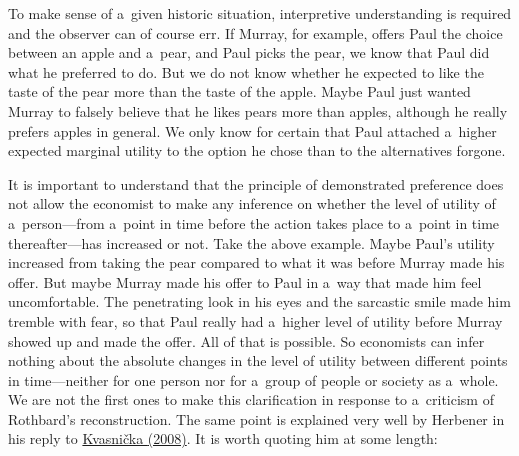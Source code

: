 To make sense of a~given historic situation, interpretive understanding is required and the observer can of course err. If Murray, for example, offers Paul the choice between an apple and a~pear, and Paul picks the pear, we know that Paul did what he preferred to do. But we do not know whether he expected to like the taste of the pear more than the taste of the apple. Maybe Paul just wanted Murray to falsely believe that he likes pears more than apples, although he really prefers apples in general. We only know for certain that Paul attached a~higher expected marginal utility to the option he chose than to the alternatives forgone.



It is important to understand that the principle of demonstrated preference does not allow the economist to make any inference on whether the level of utility of a~person---from a~point in time before the action takes place to a~point in time thereafter---has increased or not. Take the above example. Maybe Paul's utility increased from taking the pear compared to what it was before Murray made his offer. But maybe Murray made his offer to Paul in a~way that made him feel uncomfortable. The penetrating look in his eyes and the sarcastic smile made him tremble with fear, so that Paul really had a~higher level of utility before Murray showed up and made the offer. All of that is possible. So economists can infer nothing about the absolute changes in the level of utility between different points in time---neither for one person nor for a~group of people or society as a~whole. We are not the first ones to make this clarification in response to a~criticism of Rothbard's reconstruction. The same point is explained very well by Herbener 
\parencite[][p.63]{herbener_defense_2008} %
 in his reply to \href{https://www.zotero.org/google-docs/?MN1lOj}{Kvasnička }\label{ref:RNDkFYd3iLdgE}\href{https://www.zotero.org/google-docs/?MN1lOj}{(2008)}. It is worth quoting him at some length:



